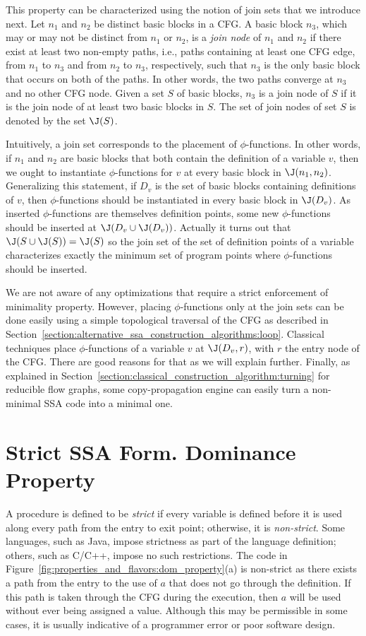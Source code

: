 This property can be characterized using the notion of join sets that we introduce next.
Let $n_{1}$ and $n_{2}$ be distinct basic blocks in a CFG. A basic block
$n_{3}$, which may or may not be distinct from $n_{1}$ or $n_{2}$, is 
a \emph{join node} of $n_{1}$ and $n_{2}$ if there exist at least two
non-empty paths, i.e., paths containing at least one CFG edge, from 
$n_{1}$ to $n_{3}$ and from $n_{2}$ to $n_{3}$, respectively, such that
$n_{3}$ is the only basic block that occurs on both of the paths. In
other words, the two paths converge at $n_{3}$ and no other CFG node. 
Given a set $S$ of basic blocks, $n_{3}$ is a join node of $S$ if it
is the join node of at least two basic blocks in $S$. The set of join
nodes of set $S$ is denoted by the set $\J(S)$. 

Intuitively, a join set corresponds to the placement of $\phi$-functions.
In other words, if $n_{1}$ and $n_{2}$ are basic blocks that both
contain the definition of a variable $v$, then we ought to instantiate
$\phi$-functions for $v$ at every basic block in $\J(n_{1}, n_{2})$. 
Generalizing this statement, if $D_v$ is the set of basic blocks containing
definitions of $v$, then $\phi$-functions should be instantiated in
every basic block in $\J(D_v)$. As inserted $\phi$-functions are themselves 
definition points, some new $\phi$-functions should be inserted at $\J(D_v\cup\J(D_v))$. 
Actually it turns out that $\J(S\cup\J(S))=\J(S)$ so the join set of the set of definition points of a variable characterizes exactly the minimum set of program points where $\phi$-functions should be inserted.

We are not aware of any optimizations that require a strict enforcement of minimality property.
However, placing $\phi$-functions only at the join sets can be done easily using a simple topological traversal of the CFG as described in Section~\ref{section:alternative_ssa_construction_algorithms:loop}. Classical techniques place $\phi$-functions of a variable $v$ at $\J(D_v,r)$, with $r$ the entry node of the CFG. There are good reasons for that as we will explain further. Finally, as explained in Section~\ref{section:classical_construction_algorithm:turning} for reducible flow graphs, some copy-propagation engine can easily turn a non-minimal SSA code into a minimal one.

\section{Strict SSA Form. Dominance Property}
\label{sec-prop-dominance}
A procedure is defined to be \emph{strict} if every variable
is defined before it is used along every path from the entry
to exit point; otherwise, it is \emph{non-strict}. 
Some languages, such as Java, impose strictness as part of the language
definition; others, such as C/C++, impose no such restrictions. 
The code in Figure~\ref{fig:properties_and_flavors:dom_property}(a) is non-strict as there exists a path from the entry to the use of $a$ that does not go through the definition. 
If this path is taken through the CFG during the execution, then $a$ will be used without ever
being assigned a value. Although this may be permissible in
some cases, it is usually indicative of a programmer error or poor software design. 


